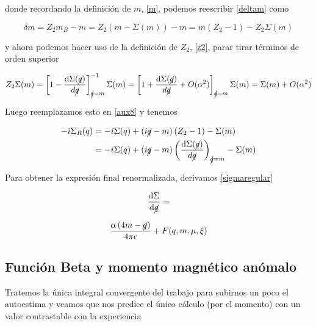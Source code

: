 \documentclass[tickz]{article}
\numberwithin{equation}{section}
\begin{document}
donde recordando la definición de $ m $, \ref{m}, podemos reescribir \ref{deltam} como

\begin{equation}\label{key}
\delta m = Z_2 m_B - m = Z_2 \left(m -\Sigma(m)\right) -m = m\left(Z_2 -1\right) - Z_2 \Sigma(m)
\end{equation}

y ahora podemos hacer uso de la definición de $ Z_2 $, \ref{z2}, parar tirar términos de orden superior

\begin{equation}\label{key}
Z_2 \Sigma(m) = \left[ 1 -\frac{\mathrm{d}\Sigma(\cancel{q})}{d\cancel{q}}\right]^{-1}_{\cancel{q}=m} \Sigma(m) = \left[ 1 +\frac{\mathrm{d}\Sigma(\cancel{q})}{d\cancel{q}} + O(\alpha^2)\right]_{\cancel{q}=m} \Sigma(m) = \Sigma(m) + O(\alpha^2)
\end{equation}

Luego reemplazamos esto en \ref{aux8} y tenemos

\begin{equation}\label{key}
\begin{aligned}
-i \Sigma_R(q) &= -i\Sigma(q) + \left(i\cancel{q} - m\right)\left(Z_2 -1\right) - \Sigma(m)\\
&= -i\Sigma(q) + \left(i\cancel{q} - m\right)\left(\frac{\mathrm{d}\Sigma(\cancel{q})}{d\cancel{q}}\right)_{\cancel{q}=m} - \Sigma(m)
\end{aligned}
\end{equation}

Para obtener la expresión final renormalizada, derivamos \ref{sigmaregular}

\begin{equation}\label{key}
\frac{\mathrm{d}\Sigma}{\mathrm{d}\cancel{q}} = 
\end{equation}

\begin{equation}\label{key}
\frac{\alpha \left(4m - \cancel{q}\right)}{4\pi \epsilon} + F(q,m,\mu,\xi)
\end{equation}





\subsection{Función Beta y momento magnético anómalo}
Tratemos la única integral convergente del trabajo para subirnos un poco el autoestima y veamos que nos predice el único cálculo (por el momento) con un valor contrastable con la experiencia\\
\end{document}
